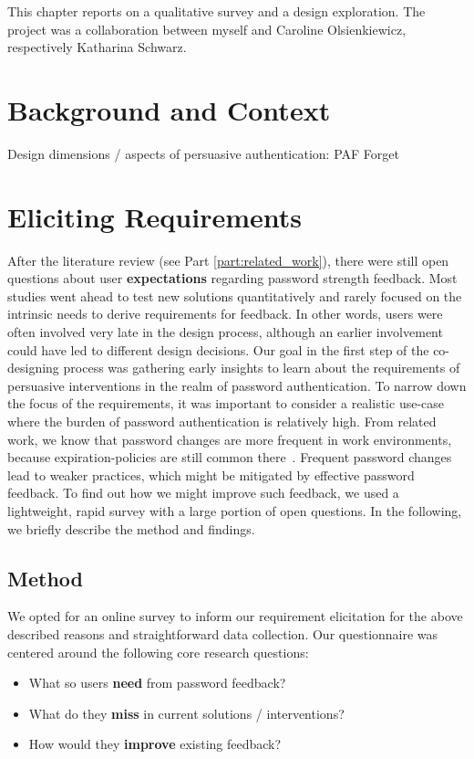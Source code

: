This chapter reports on a qualitative survey and a design exploration. The project was a collaboration between myself and Caroline Olsienkiewicz, respectively Katharina Schwarz. 

\section{Background and Context}

Design dimensions / aspects of persuasive authentication: PAF Forget \etal \cite{Forget2007PersuasionEducationSecurity}


\section{Eliciting Requirements}
After the literature review (see Part \ref{part:related_work}), there were still open questions about user \textbf{expectations} regarding password strength feedback. Most studies went ahead to test new solutions quantitatively and rarely focused on the intrinsic needs to derive requirements for feedback. In other words, users were often involved very late in the design process, although an earlier involvement could have led to different design decisions. Our goal in the first step of the co-designing process was gathering early insights to learn about the requirements of persuasive interventions in the realm of password authentication. 
%
To narrow down the focus of the requirements, it was important to consider a realistic use-case where the burden of password authentication is relatively high. From related work, we know that password changes are more frequent in work environments, because expiration-policies are still common there \cite{Inglesant2010TrueCostOfUnusablePolicies}. Frequent password changes lead to weaker practices, which might be mitigated by effective password feedback. To find out how we might improve such feedback, we used a lightweight, rapid survey with a large portion of open questions. In the following, we briefly describe the method and findings. 
 

\subsection{Method}
We opted for an online survey to inform our requirement elicitation for the above described reasons and straightforward data collection. Our questionnaire was centered around the following core research questions:
\begin{itemize}
	\item What so users \textbf{need} from password feedback?
	\item What do they \textbf{miss} in current solutions / interventions?
	\item How would they \textbf{improve} existing feedback?
\end{itemize}

